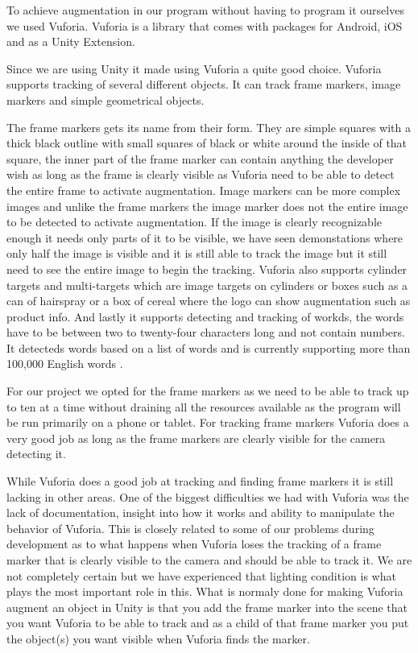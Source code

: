 To achieve augmentation in our program without having to program it ourselves we used Vuforia.
Vuforia is a library that comes with packages for Android, iOS and as a Unity Extension.

Since we are using Unity it made using Vuforia a quite good choice.
Vuforia supports tracking of several different objects. It can track frame markers, image markers and simple geometrical objects.

The frame markers gets its name from their form. They are simple squares with a thick black outline with small squares of black or white around the inside of that square, the inner part of the frame marker can
contain anything the developer wish as long as the frame is clearly visible as Vuforia need to be able to detect the entire frame to activate augmentation.
Image markers can be more complex images and unlike the frame markers the image marker does not the entire image to be detected to activate augmentation.
If the image is clearly recognizable enough it needs only parts of it to be visible, we have seen demonstations where only half the image is visible and it is still able to track the image but it still need to see the entire image to begin the tracking.
Vuforia also supports cylinder targets and multi-targets which are image targets on cylinders or boxes such as a can of hairspray or a box of cereal where the logo can show augmentation such as product info.
And lastly it supports detecting and tracking of workds, the words have to be between two to twenty-four characters long and not contain numbers.
It detecteds words based on a list of words and is currently supporting more than 100,000 English words \cite{VuforiaTextMarker}.

For our project we opted for the frame markers as we need to be able to track up to ten at a time without draining all the resources available as the program will be run primarily on a phone or tablet.
For tracking frame markers Vuforia does a very good job as long as the frame markers are clearly visible for the camera detecting it.

While Vuforia does a good job at tracking and finding frame markers it is still lacking in other areas.
One of the biggest difficulties we had with Vuforia was the lack of documentation, insight into how it works and ability to manipulate the behavior of Vuforia.
This is closely related to some of our problems during development as to what happens when Vuforia loses the tracking of a frame marker  that is clearly visible
 to the camera and should be able to track it.
We are not completely certain but we have experienced that lighting condition is what plays the most important role in this.
What is normaly done for making Vuforia augment an object in Unity is that you add the frame marker into the scene that you want Vuforia to be able to track and as a child of that frame marker you 
put the object(s) you want visible when Vuforia finds the marker.

